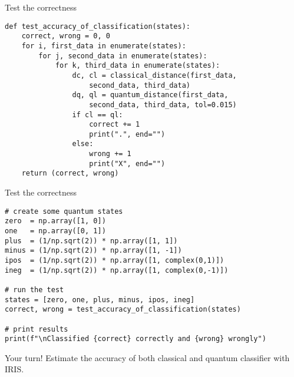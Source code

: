 \begin{frame}[fragile]{Test the correctness}
\begin{verbatim}
def test_accuracy_of_classification(states):
    correct, wrong = 0, 0
    for i, first_data in enumerate(states):
        for j, second_data in enumerate(states):
            for k, third_data in enumerate(states):
                dc, cl = classical_distance(first_data,
                    second_data, third_data)
                dq, ql = quantum_distance(first_data,
                    second_data, third_data, tol=0.015)
                if cl == ql:
                    correct += 1
                    print(".", end="")
                else:
                    wrong += 1
                    print("X", end="")
    return (correct, wrong)
\end{verbatim}
\end{frame}

\begin{frame}[fragile]{Test the correctness}
\begin{verbatim}
# create some quantum states
zero  = np.array([1, 0])
one   = np.array([0, 1])
plus  = (1/np.sqrt(2)) * np.array([1, 1])
minus = (1/np.sqrt(2)) * np.array([1, -1])
ipos  = (1/np.sqrt(2)) * np.array([1, complex(0,1)])
ineg  = (1/np.sqrt(2)) * np.array([1, complex(0,-1)])

# run the test
states = [zero, one, plus, minus, ipos, ineg]
correct, wrong = test_accuracy_of_classification(states)

# print results
print(f"\nClassified {correct} correctly and {wrong} wrongly")
\end{verbatim}
\end{frame}

\begin{frame}{Your turn!}
Estimate the accuracy of both classical and quantum classifier with IRIS.
\end{frame}